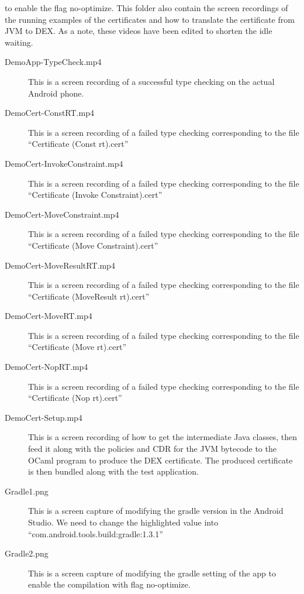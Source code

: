 \documentclass[a4]{article}
\begin{document}
\begin{description}
    to enable the flag no-optimize. This folder also contain the screen recordings of 
    the running examples of the certificates and how to translate the certificate 
    from JVM to DEX. As a note, these videos have been edited to shorten the idle 
    waiting.
    \begin{description}
      \item[DemoApp-TypeCheck.mp4] This is a screen recording of a successful type 
        checking on the actual Android phone.
      \item[DemoCert-ConstRT.mp4] This is a screen recording of a failed type checking
        corresponding to the file ``Certificate (Const rt).cert''
      \item[DemoCert-InvokeConstraint.mp4] This is a screen recording of a failed type  
        checking corresponding to the file ``Certificate (Invoke Constraint).cert''
      \item[DemoCert-MoveConstraint.mp4] This is a screen recording of a failed type 
        checking corresponding to the file ``Certificate (Move Constraint).cert''
      \item[DemoCert-MoveResultRT.mp4] This is a screen recording of a failed type 
        checking corresponding to the file ``Certificate (MoveResult rt).cert''
      \item[DemoCert-MoveRT.mp4] This is a screen recording of a failed type checking
        corresponding to the file ``Certificate (Move rt).cert''
      \item[DemoCert-NopRT.mp4] This is a screen recording of a failed type checking
        corresponding to the file ``Certificate (Nop rt).cert''
      \item[DemoCert-Setup.mp4] This is a screen recording of how to get the 
        intermediate Java classes, then feed it along with the policies and CDR for
        the JVM bytecode to the OCaml program to produce the DEX certificate. The 
        produced certificate is then bundled along with the test application.
      \item[Gradle1.png] This is a screen capture of modifying the gradle version in
        the Android Studio. We need to change the highlighted value into
        ``com.android.tools.build:gradle:1.3.1''
      \item[Gradle2.png] This is a screen capture of modifying the gradle setting of
        the app to enable the compilation with flag no-optimize.
    \end{description}
\end{description}
\end{document}
